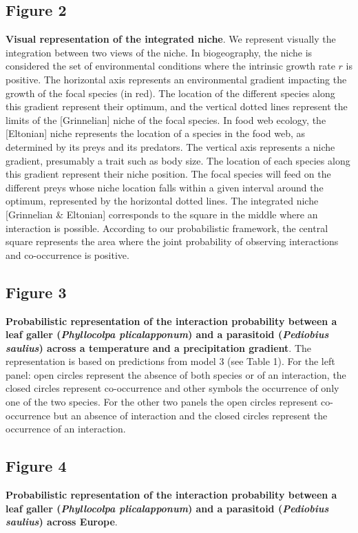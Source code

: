 \documentclass[12pt]{article}
\begin{document}
\subsection*{Figure 2}
\textbf{Visual representation of the integrated niche}. 
We represent visually the integration between two views of the niche. In
biogeography, the niche is considered the set of environmental conditions
where the intrinsic growth rate $r$ is positive. The horizontal axis
represents an environmental gradient impacting the growth of the focal species
(in red). The location of the different species along this gradient represent
their optimum, and the vertical dotted lines represent the limits of the
[Grinnelian] niche of the focal species. In food web ecology, the [Eltonian]
niche represents the location of a species in the food web, as determined by
its preys and its predators. The vertical axis represents a niche gradient,
presumably a trait such as body size. The location of each species along this
gradient represent their niche position. The focal species will feed on the
different preys whose niche location falls within a given interval around the
optimum, represented by the horizontal dotted lines. The integrated niche
[Grinnelian \& Eltonian] corresponds to the square in the middle where an
interaction is possible. According to our probabilistic framework, the central
square represents the area where the joint probability of observing
interactions and co-occurrence is positive.

\subsection*{Figure 3}
\textbf{Probabilistic representation of the interaction probability between a leaf galler (\textit{Phyllocolpa plicalapponum}) and a parasitoid (\textit{Pediobius saulius}) across a temperature and a precipitation gradient}. The representation is based on predictions from model 3 (see Table 1). For the left panel: open circles represent the absence of both species or of an interaction, the closed circles represent co-occurrence and other symbols the occurrence of only one of the two species. For the other two panels the open circles represent co-occurrence but an absence of interaction and the closed circles represent the occurrence of an interaction. 

\subsection*{Figure 4}
\textbf{Probabilistic representation of the interaction probability between a leaf galler (\textit{Phyllocolpa plicalapponum}) and a parasitoid (\textit{Pediobius saulius}) across Europe}. 
\end{document}
